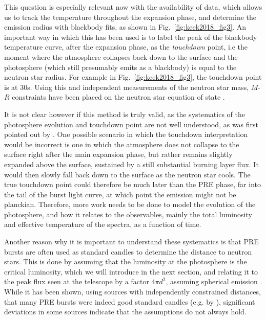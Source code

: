 \documentclass[../main.tex]{subfiles}
\begin{document}
This question is especially relevant now with the availability of \Nicer {} data, which allows us to track the temperature throughout the expansion phase, and determine the emission radius with blackbody fits, as shown in Fig.~\ref{fig:keek2018_fig3}. An important way in which this has been used is to label the peak of the blackbody temperature curve, after the expansion phase, as the \textit{touchdown} point, i.e the moment where the atmosphere collapses back down to the surface and the photosphere (which still presumably emits as a blackbody) is equal to the neutron star radius. For example in Fig.~\ref{fig:keek2018_fig3}, the touchdown point is at 30s. Using this and independent measurements of the neutron star mass, $M$-$R$ constraints have been placed on the neutron star equation of state \citep{Ozel2016a}.  

It is not clear however if this method is truly valid, as the systematics of the photosphere evolution and touchdown point are not well understood, as was first pointed out by \citet{Steiner2010}. One possible scenario in which the touchdown interpretation would be incorrect is one in which the atmosphere does not collapse to the surface right after the main expansion phase, but rather remains slightly expanded above the surface, sustained by a still substantial burning layer flux. It would then slowly fall back down to the surface as the neutron star cools. The true touchdown point could therefore be much later than the PRE phase, far into the tail of the burst light curve, at which point the emission might not be planckian. Therefore, more work needs to be done to model the evolution of the photosphere, and how it relates to the observables, mainly the total luminosity and effective temperature of the spectra, as a function of time. 

Another reason why it is important to understand these systematics is that PRE bursts are often used as standard candles to determine the distance to neutron stars. This is done by assuming that the luminosity at the photosphere is the critical luminosity, which we will introduce in the next section, and relating it to the peak flux seen at the telescope by a factor $4\pi d^2$, assuming spherical emission \citep{Galloway2008}. While it has been shown, using sources with independently constrained distances, that many PRE bursts were indeed good standard candles (e.g. by \citet{Kuulkers2003}), significant deviations in some sources indicate that the assumptions do not always hold.
\end{document}
